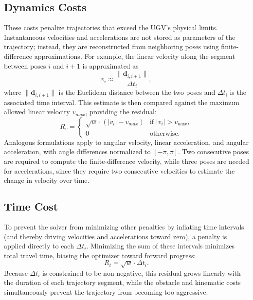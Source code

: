 \subsection{Dynamics Costs}
\label{subsec:dynamics-costs}
These costs penalize trajectories that exceed the UGV's physical limits. Instantaneous velocities and accelerations are not stored as parameters of the trajectory; instead, they are reconstructed from neighboring poses using finite-difference approximations. For example, the linear velocity along the segment between poses $i$ and $i+1$ is approximated as
\begin{equation}
    v_i \approx \frac{\|\mathbf{d}_{i,i+1}\|}{\Delta t_i},
\end{equation}
where $\|\mathbf{d}_{i,i+1}\|$ is the Euclidean distance between the two poses and $\Delta t_i$ is the associated time interval. This estimate is then compared against the maximum allowed linear velocity $v_{max}$, providing the residual:
\begin{equation}
    R_{v} = \begin{cases} 
    \sqrt{w} \cdot (|v_i| - v_{max}) & \text{if } |v_i| > v_{max}, \\ 
    0 & \text{otherwise}. 
    \end{cases}
\end{equation}
Analogous formulations apply to angular velocity, linear acceleration, and angular acceleration, with angle differences normalized to $[-\pi, \pi]$. Two consecutive poses are required to compute the finite-difference velocity, while three poses are needed for accelerations, since they require two consecutive velocities to estimate the change in velocity over time.

\subsection{Time Cost}
\label{subsec:time-cost}
To prevent the solver from minimizing other penalties by inflating time intervals (and thereby driving velocities and accelerations toward zero), a penalty is applied directly to each $\Delta t_i$. Minimizing the sum of these intervals minimizes total travel time, biasing the optimizer toward forward progress:
\begin{equation}
    R_{t} = \sqrt{w} \cdot \Delta t_i.
\end{equation}
Because $\Delta t_i$ is constrained to be non-negative, this residual grows linearly with the duration of each trajectory segment, while the obstacle and kinematic costs simultaneously prevent the trajectory from becoming too aggressive.

